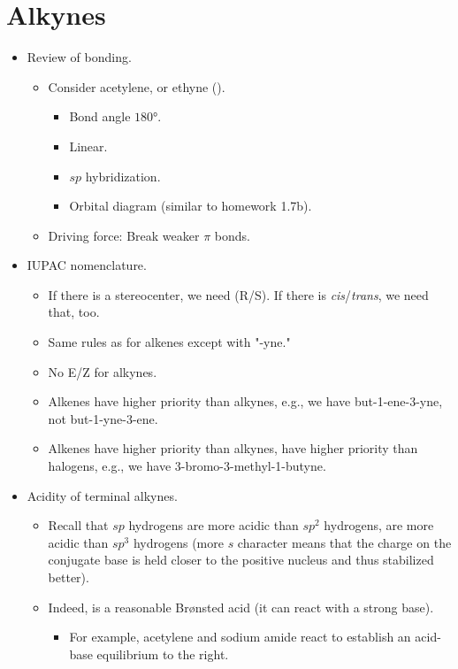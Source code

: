 \documentclass[../notes.tex]{subfiles}
\begin{document}
\section{Alkynes}
\begin{itemize}
    \item Review of bonding.
    \begin{itemize}
        \item Consider acetylene, or ethyne ().
        \begin{itemize}
            \item Bond angle $\ang{180}$.
            \item Linear.
            \item $sp$ hybridization.
            \item Orbital diagram (similar to homework 1.7b).
        \end{itemize}
        \item Driving force: Break weaker $\pi$ bonds.
    \end{itemize}
    \item IUPAC nomenclature.
    \begin{itemize}
        \item If there is a stereocenter, we need (R/S). If there is \emph{cis}/\emph{trans}, we need that, too.
        \item Same rules as for alkenes except with "-yne."
        \item No E/Z for alkynes.
        \item Alkenes have higher priority than alkynes, e.g., we have but-1-ene-3-yne, not but-1-yne-3-ene.
        \item Alkenes have higher priority than alkynes, have higher priority than halogens, e.g., we have 3-bromo-3-methyl-1-butyne.
    \end{itemize}
    \item Acidity of terminal alkynes.
    \begin{itemize}
        \item Recall that $sp$ hydrogens are more acidic than $sp^2$ hydrogens, are more acidic than $sp^3$ hydrogens (more $s$ character means that the charge on the conjugate base is held closer to the positive nucleus and thus stabilized better).
        \item Indeed,  is a reasonable Br\o nsted acid (it can react with a strong base).
        \begin{itemize}
            \item For example, acetylene and sodium amide react to establish an acid-base equilibrium to the right.

\end{itemize}
\end{itemize}
\end{itemize}
\end{document}
